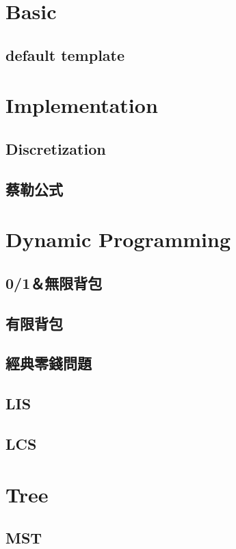 \section{Basic}
	\subsection{default template}
		
\section{Implementation}
	\subsection{Discretization}
		
	\subsection{蔡勒公式}
		
\section{Dynamic Programming}
	\subsection{0/1＆無限背包}
		
	\subsection{有限背包}
		
	\subsection{經典零錢問題}
		
	\subsection{LIS}
		
	\subsection{LCS}
		
\section{Tree}
	\subsection{MST}

